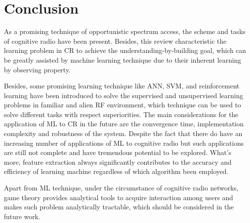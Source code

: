 \documentclass[journal]{IEEEtran}
\begin{document}
\section{Conclusion}
As a promising technique of opportunistic spectrum access, the scheme and tasks of cognitive radio have been present. Besides, this review characteristic the learning problem in CR to achieve the understanding-by-building goal, which can be greatly assisted by machine learning technique due to their inherent learning by observing property.

Besides, some promising learning technique like ANN, SVM, and reinforcement learning have been introduced to solve the supervised and unsupervised learning problems in familiar and alien RF environment, which technique can be used to solve different tasks with respect superiorities. The main considerations for the application of ML to CR in the future are the convergence time, implementation complexity and robustness of the system. Despite the fact that there do have an increasing number of applications of ML to cognitive radio but such applications are still not complete and have tremendous potential to be explored. What's more, feature extraction always significantly contributes to the accuracy and efficiency of learning machine regardless of which algorithm been employed.

Apart from ML technique, under the circumstance of cognitive radio networks, game theory provides analytical tools to acquire interaction among users and makes such problem analytically tractable, which should be considered in the future work.




%
\end{document}
